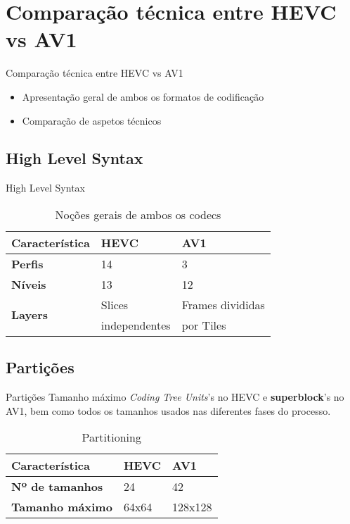 \documentclass{beamer}
\begin{document}
\section{Comparação técnica entre HEVC vs AV1}

\begin{frame}{Comparação técnica entre HEVC vs AV1}
	\begin{itemize}
		\item Apresentação geral de ambos os formatos de codificação
		\item Comparação de aspetos técnicos
	\end{itemize}
\end{frame}

\subsection{High Level Syntax}
\begin{frame}{High Level Syntax}
	\begin{table}
		\centering
		\begin{tabular}{l|l|l}
			\textbf{Característica} 					& \textbf{HEVC} 	& \textbf{AV1} \\\hline
			\textbf{Perfis} 									& 14 							& 3 \\
			\textbf{Níveis} 									& 13 							& 12 \\
			\multirow{2}{*}{\textbf{Layers}} 	& Slices 					& Frames divididas \\
			& independentes 	& por Tiles \\
		\end{tabular}
		\caption{\label{tab:high-level}Noções gerais de ambos os codecs}
	\end{table}
\end{frame}

\subsection{Partições}
\begin{frame}{Partições}
	Tamanho máximo \textit{Coding Tree Units}'s no HEVC e \textbf{superblock}'s no AV1, bem como todos os tamanhos usados nas diferentes fases do processo.
	\begin{table}
		\centering
		\begin{tabular}{l|l|l}
			\textbf{Característica} 					& \textbf{HEVC} 	& \textbf{AV1} \\\hline
			\textbf{Nº de tamanhos} 					& 24 							& 42 \\
			\textbf{Tamanho máximo} 					& 64x64 					& 128x128
		\end{tabular}
		\caption{\label{tab:partitioning}Partitioning}
	\end{table}
\end{frame}
\end{document}
